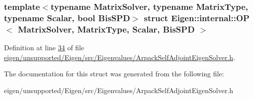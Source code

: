 \subsubsection*{template$<$typename Matrix\+Solver, typename Matrix\+Type, typename Scalar, bool Bis\+S\+PD$>$\newline
struct Eigen\+::internal\+::\+O\+P$<$ Matrix\+Solver, Matrix\+Type, Scalar, Bis\+S\+P\+D $>$}



Definition at line \hyperlink{eigen_2unsupported_2_eigen_2src_2_eigenvalues_2_arpack_self_adjoint_eigen_solver_8h_source_l00034}{34} of file \hyperlink{eigen_2unsupported_2_eigen_2src_2_eigenvalues_2_arpack_self_adjoint_eigen_solver_8h_source}{eigen/unsupported/\+Eigen/src/\+Eigenvalues/\+Arpack\+Self\+Adjoint\+Eigen\+Solver.\+h}.



The documentation for this struct was generated from the following file\+:\begin{DoxyCompactItemize}
\item 
eigen/unsupported/\+Eigen/src/\+Eigenvalues/\+Arpack\+Self\+Adjoint\+Eigen\+Solver.\+h\end{DoxyCompactItemize}
